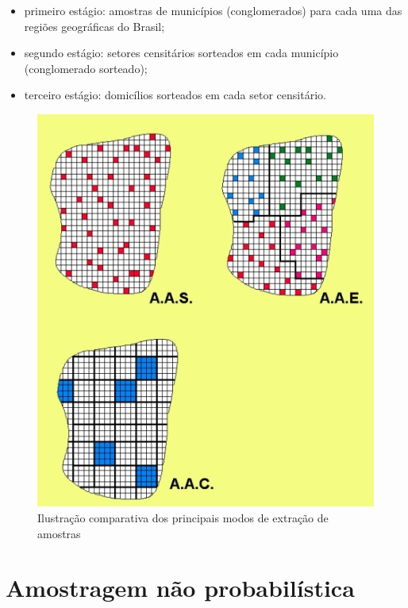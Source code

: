 \documentclass[
]{book}
\providecommand{\tightlist}{%
  \setlength{\itemsep}{0pt}\setlength{\parskip}{0pt}}
\begin{document}
\begin{itemize}
\tightlist
\item
  primeiro estágio: amostras de municípios (conglomerados) para cada uma das regiões geográficas do Brasil;\\
\item
  segundo estágio: setores censitários sorteados em cada município (conglomerado sorteado);\\
\item
  terceiro estágio: domicílios sorteados em cada setor censitário.
\end{itemize}

\hfill\break

\begin{figure}

{\centering \includegraphics[width=1\linewidth]{images7/simples_estratos_conglomerados} 

}

\caption{Ilustração comparativa dos principais modos de extração de amostras}\label{fig:fig41}
\end{figure}

\hypertarget{amostragem-nuxe3o-probabiluxedstica}{%
\section{Amostragem não probabilística}\label{amostragem-nuxe3o-probabiluxedstica}}
\end{document}
